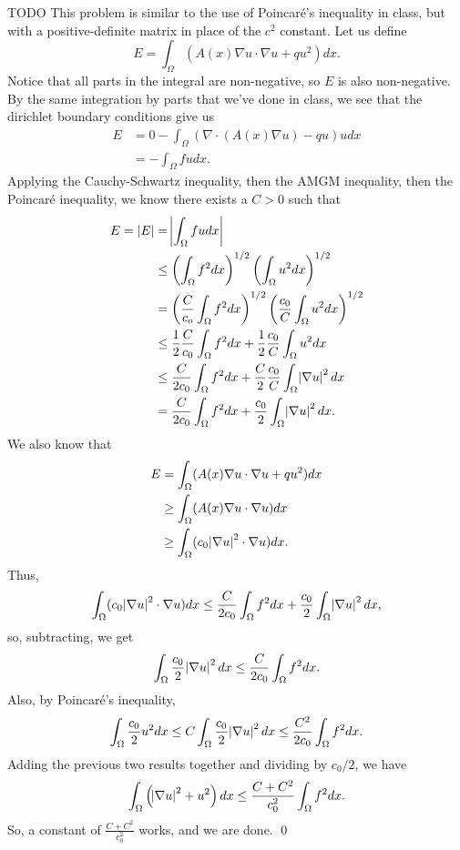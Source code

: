 \documentclass{article}
\newcommand{\D}{\nabla}
\begin{document}
\newpage
{} TODO \tri
\hop
\solution
This problem is similar to the use of Poincar\'e's inequality in class, but with a positive-definite matrix in place of the $c^2$ constant.
\hop 
Let us define 
\[E= \int_\Omega (A(x)\D u \cdot \D u + qu^2)dx.\]
Notice that all parts in the integral are non-negative, so $E$ is also non-negative. By the same integration by parts that we've done in class, we see that the dirichlet boundary conditions give us
\begin{align*}
    E &= 0 - \int_\Omega (\D \cdot (A(x) \D u) - qu)u dx \\
    &= -\int_\Omega fu dx.
\end{align*}
Applying the Cauchy-Schwartz inequality, then the AMGM inequality, then the Poincar\'e inequality, we know there exists a $C > 0$ such that 
\begin{align*}
    E = |E| &= \abs{\int_\Omega fu dx} \\
    &\le \del{\int_\Omega f^2 dx}^{1/2} \del{\int_\Omega u^2 dx}^{1/2} \\
    &= \del{\frac{C}{c_o}\int_\Omega f^2 dx}^{1/2} \del{\frac{c_0}{C}\int_\Omega u^2 dx}^{1/2} \\
    &\le \frac{1}{2}\frac{C}{c_0}\int_\Omega f^2 dx + \frac{1}{2}\frac{c_0}{C}\int_\Omega u^2 dx \\ 
    & \le \frac{C}{2c_0}\int_\Omega f^2 dx + \frac{C}{2}\frac{c_0}{C}\int_\Omega \abs{\D u}^2 dx \\
    &=  \frac{C}{2c_0}\int_\Omega f^2 dx +\frac{c_0}{2}\int_\Omega \abs{\D u}^2 dx.
\end{align*}
We also know that 
\begin{align*}
    E&= \int_\Omega (A(x)\D u \cdot \D u + qu^2)dx\\
    &\ge \int_\Omega (A(x)\D u \cdot \D u)dx\\
    &\ge \int_\Omega (c_0\abs{\D u}^2 \cdot \D u)dx.
\end{align*}
Thus, 
\[ \int_\Omega (c_0\abs{\D u}^2 \cdot \D u)dx \le \frac{C}{2c_0}\int_\Omega f^2 dx +\frac{c_0}{2}\int_\Omega \abs{\D u}^2 dx,\]
so, subtracting, we get 
\[ \int_\Omega \frac{c_0}{2} \abs{\D u}^2 dx \le \frac{C}{2c_0}\int_\Omega f^2 dx.\]
Also, by Poincar\'e's inequality, 
\[\int_\Omega \frac{c_0}{2}u^2 dx \le C \int_\Omega\frac{c_0}{2} \abs{\D u}^2dx \le \frac{C^2}{2c_0}\int_\Omega f^2 dx.\]
Adding the previous two results together and dividing by $c_0/2$, we have 
\[\int_\Omega \del{\abs{\D u}^2  + u^2}dx \le \frac{C+C^2}{c_0^2}\int_\Omega f^2 dx.\]
So, a constant of $\frac{C+C^2}{c_0^2}$ works, and we are done. \qed
\end{document}
